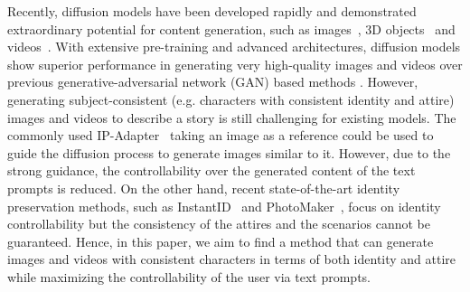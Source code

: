 \documentclass{article} %
\begin{document}
Recently, diffusion models have been developed rapidly and demonstrated extraordinary potential for content generation, such as images~\citep{rombach2022high, Peebles2022DiT, podell2023sdxl}, 3D objects~\citep{Zeng2022lion,Zhou2021shape3d} and videos~\citep{ho2022imagen, wang2023modelscope}.
%
With extensive pre-training and advanced architectures, diffusion models show superior performance in generating very high-quality images and videos over previous generative-adversarial network (GAN) based methods \citep{brock2018large}.
%
However, generating subject-consistent (e.g. characters with consistent identity and attire) images and videos to describe a story is still challenging for existing models.
%
The commonly used IP-Adapter~\citep{ye2023ip} taking an image as a reference could be used to guide the diffusion process to generate images similar to it.
%
However, due to the strong guidance, the controllability over the generated content of the text prompts is reduced.
%
On the other hand, recent state-of-the-art identity preservation methods, such as InstantID~\citep{wang2024instantid} and PhotoMaker~\citep{li2023photomaker}, focus on identity controllability but the consistency of the attires and the scenarios cannot be guaranteed. 
%
Hence, in this paper, we aim to find a method that can generate images and videos with consistent characters in terms of both identity and attire while maximizing the controllability of the user via text prompts.
\end{document}
